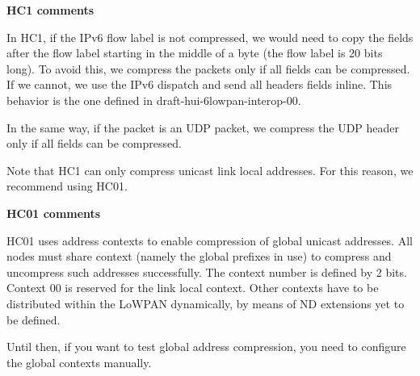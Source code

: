 {\bfseries \-H\-C1 comments}\par
 \-In \-H\-C1, if the \-I\-Pv6 flow label is not compressed, we would need to copy the fields after the flow label starting in the middle of a byte (the flow label is 20 bits long). \-To avoid this, we compress the packets only if all fields can be compressed. \-If we cannot, we use the \-I\-Pv6 dispatch and send all headers fields inline. \-This behavior is the one defined in draft-\/hui-\/6lowpan-\/interop-\/00.\par
 \-In the same way, if the packet is an \-U\-D\-P packet, we compress the \-U\-D\-P header only if all fields can be compressed.\par
 \-Note that \-H\-C1 can only compress unicast link local addresses. \-For this reason, we recommend using \-H\-C01.

{\bfseries \-H\-C01 comments}\par
 \-H\-C01 uses address contexts to enable compression of global unicast addresses. \-All nodes must share context (namely the global prefixes in use) to compress and uncompress such addresses successfully. \-The context number is defined by 2 bits. \-Context 00 is reserved for the link local context. \-Other contexts have to be distributed within the \-Lo\-W\-P\-A\-N dynamically, by means of \-N\-D extensions yet to be defined.\par
 \-Until then, if you want to test global address compression, you need to configure the global contexts manually.



 